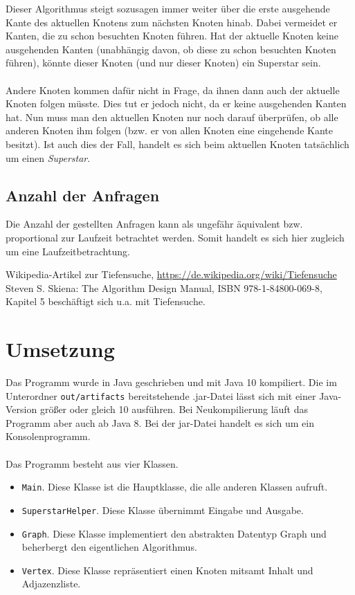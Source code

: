 \documentclass[a4paper, notitlepage, 12pt]{scrartcl}
\begin{document}
Dieser Algorithmus steigt sozusagen immer weiter über die erste ausgehende Kante des aktuellen Knotens zum nächsten Knoten hinab. Dabei vermeidet er Kanten, die zu schon besuchten Knoten führen. Hat der aktuelle Knoten keine ausgehenden Kanten (unabhängig davon, ob diese zu schon besuchten Knoten führen), könnte dieser Knoten (und nur dieser Knoten) ein Superstar sein.
\\ \\
Andere Knoten kommen dafür nicht in Frage, da ihnen dann auch der aktuelle Knoten folgen müsste. Dies tut er jedoch nicht, da er keine ausgehenden Kanten hat. Nun muss man den aktuellen Knoten nur noch darauf überprüfen, ob alle anderen Knoten ihm folgen (bzw. er von allen Knoten eine eingehende Kante besitzt). Ist auch dies der Fall, handelt es sich beim aktuellen Knoten tatsächlich um einen \textit{Superstar}.

\subsection{Anzahl der Anfragen}
Die Anzahl der gestellten Anfragen kann als ungefähr äquivalent bzw. proportional zur Laufzeit betrachtet werden. Somit handelt es sich hier zugleich um eine Laufzeitbetrachtung.

  \begin{thebibliography}{xx}
     Wikipedia-Artikel zur Tiefensuche, \url{https://de.wikipedia.org/wiki/Tiefensuche}
     Steven S. Skiena: The Algorithm Design Manual, ISBN 978-1-84800-069-8, Kapitel 5 beschäftigt sich u.a. mit Tiefensuche.
  \end{thebibliography}
\section{Umsetzung}
Das Programm wurde in Java geschrieben und mit Java 10 kompiliert. Die im Unterordner \texttt{out/artifacts} bereitstehende .jar-Datei lässt sich mit einer Java-Version größer oder gleich 10 ausführen. Bei Neukompilierung läuft das Programm aber auch ab Java 8. Bei der jar-Datei handelt es sich um ein Konsolenprogramm. \\ \\
Das Programm besteht aus vier Klassen.
\begin{itemize}
  \item \texttt{Main}. Diese Klasse ist die Hauptklasse, die alle anderen Klassen aufruft.
  \item \texttt{SuperstarHelper}. Diese Klasse übernimmt Eingabe und Ausgabe.
  \item \texttt{Graph}. Diese Klasse implementiert den abstrakten Datentyp Graph und beherbergt den eigentlichen Algorithmus.
  \item \texttt{Vertex}. Diese Klasse repräsentiert einen Knoten mitsamt Inhalt und Adjazenzliste.
\end{itemize}
\end{document}
